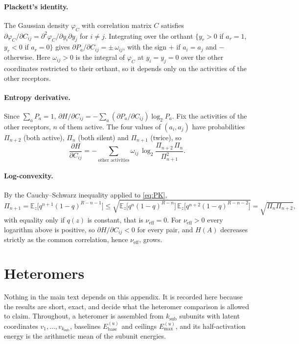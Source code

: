 \documentclass[11pt,a4paper]{article}
\newcommand{\EE}{\mathbb{E}}
\newcommand{\ksub}{k_{\mathrm{sub}}}
\newcommand{\Ebase}{E_{\mathrm{base}}}
\newcommand{\Emax}{E_{\mathrm{max}}}
\newcommand{\nueff}{\nu_{\mathrm{eff}}}
\begin{document}
\paragraph{Plackett's identity.} The Gaussian density $\varphi_C$ with correlation matrix
$C$ satisfies $\partial\varphi_C/\partial C_{ij}=\partial^2\varphi_C/\partial y_i\partial
y_j$ for $i\neq j$. Integrating over the orthant $\{y_r>0$ if $a_r=1$, $y_r<0$ if
$a_r=0\}$ gives $\partial P_a/\partial C_{ij}=\pm\,\omega_{ij}$, with the sign $+$ if
$a_i=a_j$ and $-$ otherwise. Here $\omega_{ij}>0$ is the integral of $\varphi_C$ at
$y_i=y_j=0$ over the other coordinates restricted to their orthant, so it depends only on
the activities of the other receptors.

\paragraph{Entropy derivative.} Since $\sum_aP_a=1$,
$\partial H/\partial C_{ij}=-\sum_a(\partial P_a/\partial C_{ij})\log_2P_a$. Fix the
activities of the other receptors, $n$ of them active. The four values of $(a_i,a_j)$ have
probabilities $\Pi_{n+2}$ (both active), $\Pi_n$ (both silent) and $\Pi_{n+1}$ (twice), so
\begin{equation*}
  \frac{\partial H}{\partial C_{ij}}
  =-\sum_{\text{other activities}}\omega_{ij}\,
  \log_2\frac{\Pi_{n+2}\,\Pi_n}{\Pi_{n+1}^2}.
\end{equation*}

\paragraph{Log-convexity.} By the Cauchy--Schwarz inequality applied to \eqref{eq:PK},
\begin{equation*}
  \Pi_{n+1}=\EE_z\big[q^{n+1}(1-q)^{R-n-1}\big]
  \le\sqrt{\EE_z\big[q^n(1-q)^{R-n}\big]\,\EE_z\big[q^{n+2}(1-q)^{R-n-2}\big]}
  =\sqrt{\Pi_n\Pi_{n+2}},
\end{equation*}
with equality only if $q(z)$ is constant, that is $\nueff=0$. For $\nueff>0$ every
logarithm above is positive, so $\partial H/\partial C_{ij}<0$ for every pair, and $H(A)$
decreases strictly as the common correlation, hence $\nueff$, grows.

\section{Heteromers}
\label{app:hetero}

Nothing in the main text depends on this appendix. It is recorded here because the
results are short, exact, and decide what the heteromer comparison is allowed to claim.
Throughout, a heteromer is assembled from $\ksub$ subunits with latent coordinates
$v_1,\dots,v_{\ksub}$, baselines $\Ebase^{(u)}$ and ceilings $\Emax^{(u)}$, and its
half-activation energy is the arithmetic mean of the subunit energies.
\end{document}

